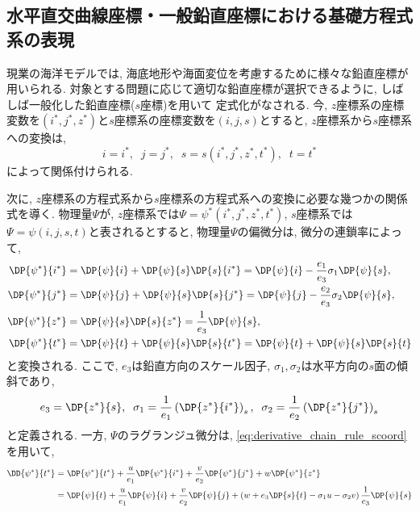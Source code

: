 \subsection{水平直交曲線座標・一般鉛直座標における基礎方程式系の表現}
現業の海洋モデルでは, 海底地形や海面変位を考慮するために様々な鉛直座標が用いられる. 
対象とする問題に応じて適切な鉛直座標が選択できるように, しばしば一般化した鉛直座標($s$座標)を用いて
定式化がなされる. 
今, $z$座標系の座標変数を$(i^*,j^*,z^*)$と$s$座標系の座標変数を$(i,j,s)$とすると, 
$z$座標系から$s$座標系への変換は, 
\begin{equation*}
  i = i^*, \;\; j = j^*, \;\; s = s(i^*,j^*,z^*,t^*), \;\; t=t^*
\end{equation*}
によって関係付けられる. 

次に, $z$座標系の方程式系から$s$座標系の方程式系への変換に必要な幾つかの関係式を導く.
物理量$\Psi$が, $z$座標系では$\Psi=\psi^*(i^*,j^*,z^*,t^*)$,
$s$座標系では$\Psi=\psi(i,j,s,t)$と表されるとすると, 
物理量$\Psi$の偏微分は, 微分の連鎖率によって, 
\begin{equation}
\begin{split}
 \DP{\psi^*}{i^*} &= \DP{\psi}{i} + \DP{\psi}{s}\DP{s}{i^*} 
                   = \DP{\psi}{i} - \dfrac{e_1}{e_3}\sigma_1 \DP{\psi}{s}, \\
 \DP{\psi^*}{j^*} &= \DP{\psi}{j} + \DP{\psi}{s}\DP{s}{j^*} 
                   = \DP{\psi}{j} - \dfrac{e_2}{e_3}\sigma_2 \DP{\psi}{s}, \\
 \DP{\psi^*}{z^*} &= \DP{\psi}{s} \DP{s}{z^*} 
                   = \dfrac{1}{e_3} \DP{\psi}{s}, \\
 \DP{\psi^*}{t^*} &= \DP{\psi}{t} + \DP{\psi}{s}\DP{s}{t^*} 
                   = \DP{\psi}{t} + \DP{\psi}{s}\DP{s}{t}                   
\end{split}
\label{eq:derivative_chain_rule_scoord}
\end{equation}
と変換される. 
ここで, $e_3$は鉛直方向のスケール因子, $\sigma_1, \sigma_2$は水平方向の$s$面の傾斜であり, 
\begin{equation*}
 e_3 = \DP{z^*}{s}, \;\; 
 \sigma_1 = \dfrac{1}{e_1} \left(\DP{z^*}{i^*}\right)_s, \;\;
 \sigma_2 = \dfrac{1}{e_2} \left(\DP{z^*}{j^*}\right)_s
\end{equation*} 
と定義される. 
一方, $\Psi$のラグランジュ微分は, \eqref{eq:derivative_chain_rule_scoord}を用いて, 
\begin{equation*}
\begin{split}
 \DD{\psi^*}{t^*} &=   \DP{\psi^*}{t^*} 
                     + \dfrac{u}{e_1}\DP{\psi^*}{i^*}
                     + \dfrac{v}{e_2}\DP{\psi^*}{j^*}
                     + w\DP{\psi^*}{z^*} \\
                 &= \DP{\psi}{t} 
                     + \dfrac{u}{e_1}\DP{\psi}{i}
                     + \dfrac{v}{e_2}\DP{\psi}{j}
                     + \left(w + e_3 \DP{s}{t} - \sigma_1 u - \sigma_2 v \right) \dfrac{1}{e_3} \DP{\psi}{s}
\end{split}
\end{equation*}
